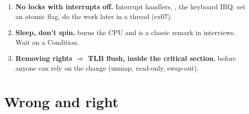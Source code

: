 \begin{enumerate}
  last action of  --- and A1-01 shows what happens when a killed
  thread is still in a Condition's waiters list).
\item \textbf{No locks with interrupts off.} Interrupt handlers, , the
  keyboard IRQ: set an atomic flag, do the work later in a thread (ex07).
\item \textbf{Sleep, don't spin.}  burns the CPU and is a classic
  remark in interviews. Wait on a Condition.
\item \textbf{Removing rights $\Rightarrow$ TLB flush, inside the critical section}, before
  anyone can rely on the change (unmap, read-only, swap-out).
\end{enumerate}

\section{Wrong and right}

